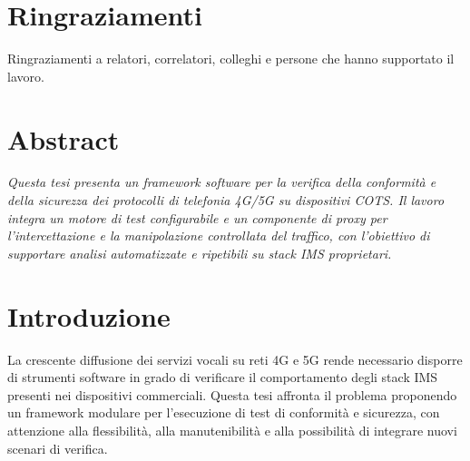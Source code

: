\chapter*{Ringraziamenti}
Ringraziamenti a relatori, correlatori, colleghi e persone che hanno supportato il lavoro.

\chapter*{Abstract}
\textit{Questa tesi presenta un framework software per la verifica della conformità e della sicurezza dei protocolli di telefonia 4G/5G su dispositivi COTS. Il lavoro integra un motore di test configurabile e un componente di proxy per l'intercettazione e la manipolazione controllata del traffico, con l'obiettivo di supportare analisi automatizzate e ripetibili su stack IMS proprietari.}

\chapter*{Introduzione}
 
\fancyfoot[R]{\thepage}
La crescente diffusione dei servizi vocali su reti 4G e 5G rende necessario disporre di strumenti software in grado di verificare il comportamento degli stack IMS presenti nei dispositivi commerciali. Questa tesi affronta il problema proponendo un framework modulare per l'esecuzione di test di conformità e sicurezza, con attenzione alla flessibilità, alla manutenibilità e alla possibilità di integrare nuovi scenari di verifica.

